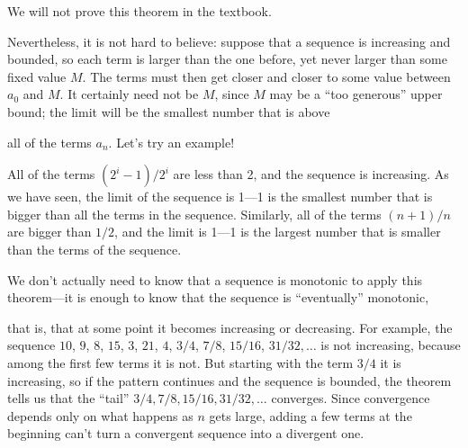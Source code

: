 \documentclass{ximera}
\begin{document}

We will not prove this theorem in the textbook.


Nevertheless, it is not hard to believe: suppose that a sequence is
increasing and bounded, so each term is larger than the one before,
yet never larger than some fixed value $M$. The terms must then get
closer and closer to some value between $ a_0$ and $M$. It certainly
need not be $M$, since $M$ may be a ``too generous'' upper bound; the
limit will be the smallest number that is above


all of the terms $ a_n$.  Let's try an example!

\begin{example}
  \label{example:sequence-bounded}
  All of the terms $ (2^i-1)/2^i$ are less than 2, and the sequence
  is increasing.  As we have seen, the limit of the sequence is 1---1
  is the smallest number that is bigger than all the terms in the
  sequence.  Similarly, all of the terms $(n+1)/n$ are bigger than
  $1/2$, and the limit is 1---1 is the largest number that is smaller
  than the terms of the sequence.
\end{example}


We don't actually need to know that a sequence is monotonic to apply
this theorem---it is enough to know that the sequence is
``eventually'' monotonic,


that is, that at some point
it becomes increasing or decreasing.  For example, the sequence $10$,
$9$, $8$, $15$, $3$, $21$, $4$, $3/4$, $7/8$, $15/16$, $31/32,\ldots$
is not increasing, because among the first few terms it is not. But
starting with the term $3/4$ it is increasing, so if the pattern
continues and the sequence is bounded, the theorem tells us that the
``tail'' $3/4, 7/8, 15/16, 31/32,\ldots$ converges.  Since convergence
depends only on what happens as $n$ gets large, adding a few terms at
the beginning can't turn a convergent sequence into a divergent one.
\end{document}
